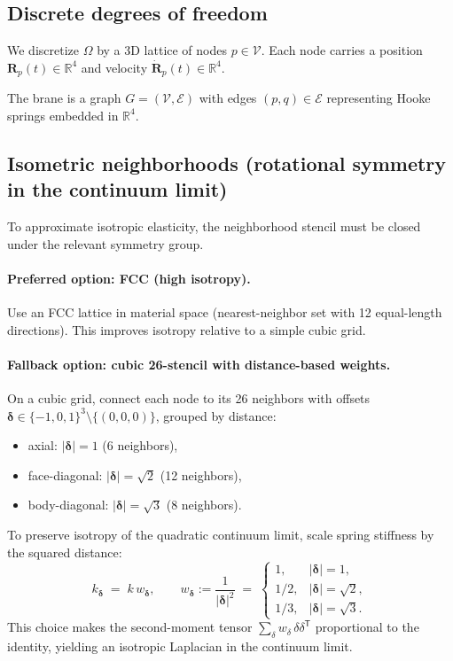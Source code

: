 \documentclass[11pt,a4paper]{article}
\begin{document}
\subsection{Discrete degrees of freedom}
We discretize $\Omega$ by a 3D lattice of nodes $p\in\mathcal{V}$.
Each node carries a position $\mathbf{R}_p(t)\in\mathbb{R}^4$ and velocity
$\dot{\mathbf{R}}_p(t)\in\mathbb{R}^4$.

The brane is a graph $G=(\mathcal{V},\mathcal{E})$ with edges $(p,q)\in\mathcal{E}$
representing Hooke springs embedded in $\mathbb{R}^4$.

\subsection{Isometric neighborhoods (rotational symmetry in the continuum limit)}
To approximate isotropic elasticity, the neighborhood stencil must be closed
under the relevant symmetry group.

\paragraph{Preferred option: FCC (high isotropy).}
Use an FCC lattice in material space (nearest-neighbor set with 12 equal-length
directions). This improves isotropy relative to a simple cubic grid.

\paragraph{Fallback option: cubic 26-stencil with distance-based weights.}
On a cubic grid, connect each node to its 26 neighbors with offsets
$\boldsymbol{\delta}\in\{-1,0,1\}^3\setminus\{(0,0,0)\}$, grouped by distance:
\begin{itemize}
\item axial: $|\boldsymbol{\delta}|=1$ (6 neighbors),
\item face-diagonal: $|\boldsymbol{\delta}|=\sqrt{2}$ (12 neighbors),
\item body-diagonal: $|\boldsymbol{\delta}|=\sqrt{3}$ (8 neighbors).
\end{itemize}
To preserve isotropy of the quadratic continuum limit, scale spring stiffness
by the squared distance:
\begin{equation}
  k_{\boldsymbol{\delta}} \;=\; k\,w_{\boldsymbol{\delta}},
  \qquad
  w_{\boldsymbol{\delta}} := \frac{1}{|\boldsymbol{\delta}|^2}
  \;=\;
  \begin{cases}
    1, & |\boldsymbol{\delta}|=1,\\
    1/2, & |\boldsymbol{\delta}|=\sqrt{2},\\
    1/3, & |\boldsymbol{\delta}|=\sqrt{3}.
  \end{cases}
  \label{eq:iso_weights}
\end{equation}
This choice makes the second-moment tensor $\sum_{\delta}w_\delta\,\delta\delta^{\mathsf T}$
proportional to the identity, yielding an isotropic Laplacian in the continuum limit.
\end{document}
